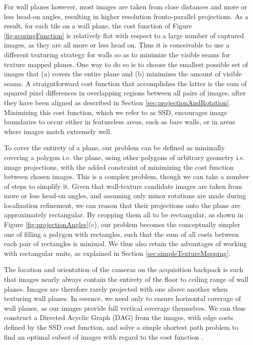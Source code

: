 \documentclass[10pt,twocolumn,letterpaper]{article}
\begin{document}
For wall planes however, most images are taken from close distances
and more or less head-on angles, resulting in higher resolution
fronto-parallel projections. As a result, for each tile on a wall
plane, the cost function of Figure \ref{fig:scoringFunction} is
relatively flat with respect to a large number of captured images, as
they are all more or less head on. Thus it is conceivable to use a
different texturing strategy for walls so as to minimize the visible
seams for texture mapped planes. One way to do so is to choose the
smallest possible set of images that (a) covers the entire plane and
(b) minimizes the amount of visible seams. A straigntforward cost
function that accomplishes the latter is the sum of squared pixel
differences in overlapping regions between all pairs of images, after
they have been aligned as described in Section
\ref{sec:projectionAndRotation}. Minimizing this cost function, which
we refer to as SSD, encourages image boundaries to occur either in
featureless areas, such as bare walls, or in areas where images match
extremely well.

To cover the entirety of a plane, our problem can be defined as
minimally covering a polygon i.e. the plane, using other polygons of
arbitrary geometry i.e. image projections, with the added constraint
of minimizing the cost function between chosen images.  This is a
complex problem, though we can take a number of steps to simplify
it. Given that wall-texture candidate images are taken from more or
less head-on angles, and assuming only minor rotations are made during
localization refinement, we can reason that their projections onto the
plane are approximately rectangular. By cropping them all to be
rectangular, as shown in Figure \ref{fig:projectionAngles}(c), our
problem becomes the conceptually simpler one of filling a polygon with
rectangles, such that the sum of all costs between each pair of
rectangles is minimal. We thus also retain the advantages of working
with rectangular units, as explained in Section
\ref{sec:simpleTextureMapping}.

The location and orientation of the cameras on the acquisition
backpack is such that images nearly always contain the entirety of the
floor to ceiling range of wall planes. Images are therefore rarely
projected with one above another when texturing wall planes. In
essence, we need only to ensure horizontal coverage of wall planes, as
our images provide full vertical coverage themselves. We can thus
construct a Directed Acyclic Graph (DAG) from the images, with edge
costs defined by the SSD cost function, and solve a simple shortest
path problem to find an optimal subset of images with regard to the
cost function \cite{dijkstra}.
\end{document}
